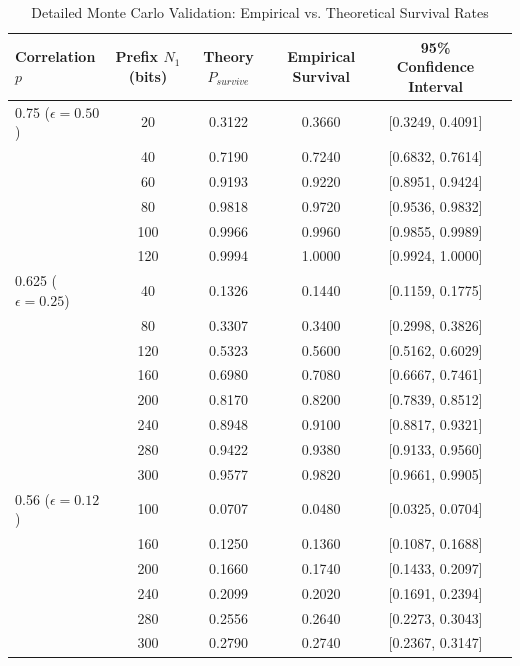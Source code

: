 \begin{table}[h]
\centering
\caption{Detailed Monte Carlo Validation: Empirical vs. Theoretical Survival Rates}
\label{tab:mc_validation_all}
\begin{tabular}{@{}lccccc@{}}
\toprule
\textbf{Correlation $p$} & \textbf{Prefix $N_1$ (bits)} & \textbf{Theory $P_{survive}$} & \textbf{Empirical Survival} & \textbf{95\% Confidence Interval} \\ \midrule
0.75 ($\epsilon=0.50$) & 20  & 0.3122 & 0.3660 & [0.3249, 0.4091] \\
                       & 40  & 0.7190 & 0.7240 & [0.6832, 0.7614] \\
                       & 60  & 0.9193 & 0.9220 & [0.8951, 0.9424] \\
                       & 80  & 0.9818 & 0.9720 & [0.9536, 0.9832] \\
                       & 100 & 0.9966 & 0.9960 & [0.9855, 0.9989] \\
                       & 120 & 0.9994 & 1.0000 & [0.9924, 1.0000] \\ \midrule
0.625 ($\epsilon=0.25$)& 40  & 0.1326 & 0.1440 & [0.1159, 0.1775] \\
                       & 80  & 0.3307 & 0.3400 & [0.2998, 0.3826] \\
                       & 120 & 0.5323 & 0.5600 & [0.5162, 0.6029] \\
                       & 160 & 0.6980 & 0.7080 & [0.6667, 0.7461] \\
                       & 200 & 0.8170 & 0.8200 & [0.7839, 0.8512] \\
                       & 240 & 0.8948 & 0.9100 & [0.8817, 0.9321] \\
                       & 280 & 0.9422 & 0.9380 & [0.9133, 0.9560] \\
                       & 300 & 0.9577 & 0.9820 & [0.9661, 0.9905] \\ \midrule
0.56 ($\epsilon=0.12$) & 100 & 0.0707 & 0.0480 & [0.0325, 0.0704] \\
                       & 160 & 0.1250 & 0.1360 & [0.1087, 0.1688] \\
                       & 200 & 0.1660 & 0.1740 & [0.1433, 0.2097] \\
                       & 240 & 0.2099 & 0.2020 & [0.1691, 0.2394] \\
                       & 280 & 0.2556 & 0.2640 & [0.2273, 0.3043] \\
                       & 300 & 0.2790 & 0.2740 & [0.2367, 0.3147] \\ \bottomrule
\end{tabular}
\end{table}

